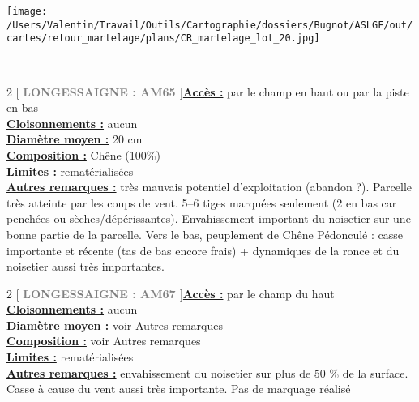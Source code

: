 \documentclass[a4paper,openany]{book}\usepackage[]{graphicx}\usepackage[]{color}
\begin{document}
\begin{center}
\texttt{[image: /Users/Valentin/Travail/Outils/Cartographie/dossiers/Bugnot/ASLGF/out/cartes/retour\_martelage/plans/CR\_martelage\_lot\_20.jpg]}
\end{center}\newpage\noindent
{}\\\begin{multicols}{2}
[
\textbf{\textcolor{gray}{
\large LONGESSAIGNE : AM65
}}
]\noindent\textbf{\underline{Accès :}} par le champ en haut ou par la piste en bas\vspace{0.1cm} \\\noindent\textbf{\underline{Cloisonnements :}} aucun\vspace{0.1cm} \\\noindent\textbf{\underline{Diamètre moyen :}} 20 cm\vspace{0.1cm} \\\noindent\textbf{\underline{Composition :}} Chêne (100\%)\vspace{0.1cm} \\\noindent\textbf{\underline{Limites :}} rematérialisées\vspace{0.1cm} \\\noindent\textbf{\underline{Autres remarques :}} très mauvais potentiel d'exploitation (abandon ?). Parcelle très atteinte par les coups de vent. 5--6 tiges marquées seulement (2 en bas car penchées ou sèches/dépérissantes). Envahissement important du noisetier sur une bonne partie de la parcelle. Vers le bas, peuplement de Chêne Pédonculé : casse importante et récente (tas de bas encore frais) + dynamiques de la ronce et du noisetier aussi très importantes.\vspace{0.1cm} \\\end{multicols}\begin{multicols}{2}
[
\textbf{\textcolor{gray}{
\large LONGESSAIGNE : AM67
}}
]\noindent\textbf{\underline{Accès :}} par le champ du haut\vspace{0.1cm} \\\noindent\textbf{\underline{Cloisonnements :}} aucun\vspace{0.1cm} \\\noindent\textbf{\underline{Diamètre moyen :}} voir Autres remarques\vspace{0.1cm} \\\noindent\textbf{\underline{Composition :}} voir Autres remarques\vspace{0.1cm} \\\noindent\textbf{\underline{Limites :}} rematérialisées\vspace{0.1cm} \\\noindent\textbf{\underline{Autres remarques :}} envahissement du noisetier sur plus de 50 \% de la surface. Casse à cause du vent aussi très importante. Pas de marquage réalisé\vspace{0.1cm} \\\end{multicols}\begin{center}

\end{center}
\end{document}
